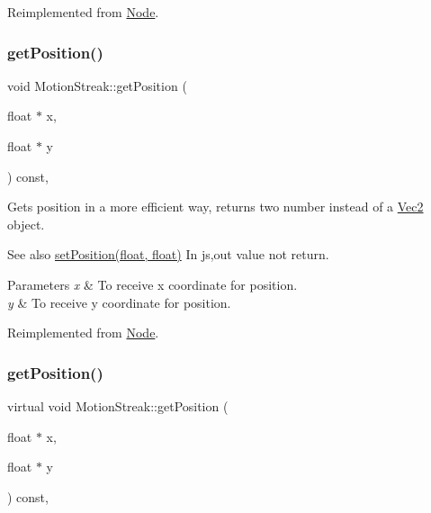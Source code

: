 Reimplemented from \hyperlink{classNode_a1c78c6feace91b27b6cbb12ee16e8eb0}{Node}.

\mbox{\label{classMotionStreak_a979de1d0159b7ebca8c4270aa8d1eece}} 
\subsubsection{\texorpdfstring{get\+Position()}{getPosition()}\hspace{0.1cm}{\footnotesize\ttfamily [3/4]}}
{\footnotesize\ttfamily void Motion\+Streak\+::get\+Position (\begin{DoxyParamCaption}\item[{float $\ast$}]{x,  }\item[{float $\ast$}]{y }\end{DoxyParamCaption}) const\hspace{0.3cm}{\ttfamily [override]}, {\ttfamily [virtual]}}

Gets position in a more efficient way, returns two number instead of a \hyperlink{classVec2}{Vec2} object.

\begin{DoxySeeAlso}{See also}
{\ttfamily \hyperlink{classMotionStreak_a8799ee17a6842cad944b85d67f1155d0}{set\+Position(float, float)}} In js,out value not return.
\end{DoxySeeAlso}

\begin{DoxyParams}{Parameters}
{\em x} & To receive x coordinate for position. \\
\hline
{\em y} & To receive y coordinate for position. \\
\hline
\end{DoxyParams}


Reimplemented from \hyperlink{classNode_a216f30e9a2dda896b2ffff1885b33a98}{Node}.

\mbox{\label{classMotionStreak_a376d2fd83190f87fa86f1aa91ac8f158}} 
\subsubsection{\texorpdfstring{get\+Position()}{getPosition()}\hspace{0.1cm}{\footnotesize\ttfamily [4/4]}}
{\footnotesize\ttfamily virtual void Motion\+Streak\+::get\+Position (\begin{DoxyParamCaption}\item[{float $\ast$}]{x,  }\item[{float $\ast$}]{y }\end{DoxyParamCaption}) const\hspace{0.3cm}{\ttfamily [override]}, {\ttfamily [virtual]}}

